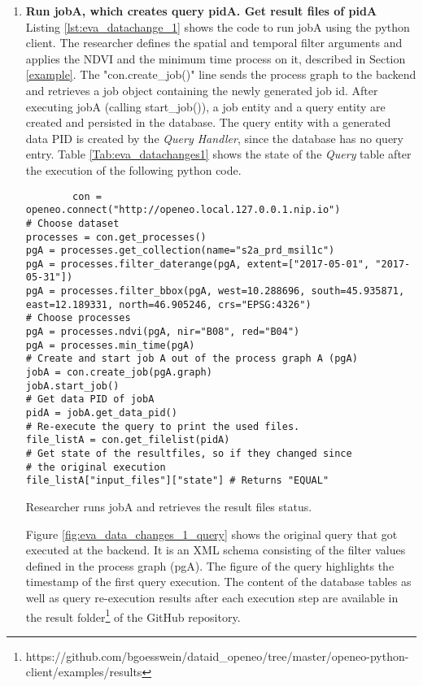 \documentclass[draft,final]{vutinfth} %
\newenvironment{code}{\captionsetup{type=listing}}{}
\begin{document}
\begin{enumerate}
	\item \textbf{Run jobA, which creates query pidA. Get result files of pidA} \\
	Listing \ref{lst:eva_datachange_1} shows the code to run jobA using the python client. The researcher defines the spatial and temporal filter arguments and applies the NDVI and the minimum time process on it, described in Section \ref{example}. The "con.create\_job()" line sends the process graph to the backend and retrieves a job object containing the newly generated job id. After executing jobA (calling start\_job()), a job entity and a query entity are created and persisted in the database. The query entity with a generated data PID is created by the \textit{Query Handler}, since the database has no query entry. Table \ref{Tab:eva_datachanges1} shows the state of the \textit{Query} table after the execution of the following python code.
	\begin{code}
		\begin{verbatim}
		con = openeo.connect("http://openeo.local.127.0.0.1.nip.io")
# Choose dataset
processes = con.get_processes()
pgA = processes.get_collection(name="s2a_prd_msil1c")
pgA = processes.filter_daterange(pgA, extent=["2017-05-01", "2017-05-31"])
pgA = processes.filter_bbox(pgA, west=10.288696, south=45.935871, 
east=12.189331, north=46.905246, crs="EPSG:4326")
# Choose processes
pgA = processes.ndvi(pgA, nir="B08", red="B04")
pgA = processes.min_time(pgA)
# Create and start job A out of the process graph A (pgA)
jobA = con.create_job(pgA.graph)
jobA.start_job()
# Get data PID of jobA
pidA = jobA.get_data_pid()
# Re-execute the query to print the used files.
file_listA = con.get_filelist(pidA)
# Get state of the resultfiles, so if they changed since 
# the original execution 
file_listA["input_files"]["state"] # Returns "EQUAL"
		\end{verbatim}
		\caption{Researcher runs jobA and retrieves the result files status.}
		\label{lst:eva_datachange_1}
	\end{code}
	Figure \ref{fig:eva_data_changes_1_query} shows the original query that got executed at the backend. It is an XML schema consisting of the filter values defined in the process graph (pgA). The figure of the query highlights the timestamp of the first query execution. The content of the database tables as well as query re-execution results after each execution step are available in the result folder\footnote{https://github.com/bgoesswein/dataid\_openeo/tree/master/openeo-python-client/examples/results} of the GitHub repository. 
	

\end{enumerate}
\end{document}
